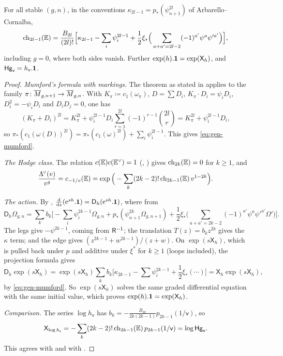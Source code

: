 \begin{lem}
\label{lem:gen-mumford}
For all stable $(g,n)$, in the conventions $\kappa_{2l-1}=p_*(\psi_{n+1}^{2l})$ of Arbarello--Cornalba,
\begin{equation}
\mathrm{ch}_{2l-1}(\mathbb{E})=\frac{B_{2l}}{(2l)!}\Big[\kappa_{2l-1}-\sum_i\psi_i^{2l-1}+\frac12\xi_*\Big(\sum_{a+a'=2l-2}(-1)^{a'}\psi^a\psi'^{a'}\Big)\Big],
\label{eq:gen-mumford}
\end{equation}
including $g=0$, where both sides vanish. Further $\exp(h).\mathbf{1}=\exp(\mathsf{X}_h)$, and $\mathsf{Hg}_{\mathsf{v}}=h_{\mathsf{v}}.\mathbf{1}$.
\end{lem}
\begin{proof}
\emph{Mumford's formula with markings.} The theorem as stated in \cite[Theorem (Mumford), Section~1.1]{FP00} applies to the family $\pi\colon\overline{M}_{g,n+1}\to\overline{M}_{g,n}$. With $K_{\pi}\coloneqq c_1(\omega_\pi)$, $D=\sum D_i$, $K_{\pi}\cdot D_i=\psi_iD_i$, $D_i^2=-\psi_iD_i$ and $D_iD_j=0$, one has
\[
(K_{\pi}+D_i)^{2l}=K_{\pi}^{2l}+\psi_i^{2l-1}D_i\sum_{r=1}^{2l}(-1)^{r-1}\binom{2l}{r}=K_{\pi}^{2l}+\psi_i^{2l-1}D_i,
\]
so $\pi_*(c_1(\omega(D))^{2l})=\pi_*(c_1(\omega)^{2l})+\sum_i\psi_i^{2l-1}$. This gives \cref{eq:gen-mumford}.

\emph{The Hodge class.} The relation $c(\mathbb{E})c(\mathbb{E}^\vee)=1$ (\cite[(5.4), (5.5)]{Mum83}, \cite[Section~2 before (22)]{FP00}) gives $\mathrm{ch}_{2k}(\mathbb{E})=0$ for $k\geq1$, and
\[
\frac{\Lambda^{\!\vee}(v)}{v^g}=c_{-1/v}(\mathbb{E})=\exp\Big(-\sum_k(2k-2)!\,\mathrm{ch}_{2k-1}(\mathbb{E})\,v^{1-2k}\Big).
\]

\emph{The action.} By \cite[Prop.~2.14]{PPZ15}, $\frac{\mathrm{d}}{\mathrm{d} s}(\mathrm{e}^{sh}.\mathbf{1})=\mathsf{D}_h(\mathrm{e}^{sh}.\mathbf{1})$, where from \cite[Defs.~2.2, 2.13]{PPZ15}
\[
\mathsf{D}_h\Omega_{g,n}=\sum_kb_k\Big[-\sum_i\psi_i^{2k-1}\Omega_{g,n}+p_*(\psi_{n+1}^{2k}\Omega_{g,n+1})+\frac12\xi_*\Big(\sum_{a+a'=2k-2}(-1)^{a'}\psi^a\psi'^{a'}\Omega'\Big)\Big].
\]
The legs give $-\psi^{2k-1}$, coming from $\mathsf{R}^{-1}$; the translation $T(z)=b_kz^{2k}$ gives the $\kappa$ term; and the edge gives $(z^{2k-1}+w^{2k-1})/(z+w)$. On $\exp(s\mathsf{X}_h)$, which is pulled back under $p$ and additive under $\xi^*$ for $k\geq1$ (loops included), the projection formula gives
\[
\mathsf{D}_h\exp(s\mathsf{X}_h)=\exp(s\mathsf{X}_h)\sum_kb_k\Big[\kappa_{2k-1}-\sum\psi_i^{2k-1}+\frac12\xi_*(\cdots)\Big]=\mathsf{X}_h\exp(s\mathsf{X}_h),
\]
by \cref{eq:gen-mumford}. So $\exp(s\mathsf{X}_h)$ solves the same graded differential equation with the same initial value, which proves $\exp(h).\mathbf{1}=\exp(\mathsf{X}_h)$.

\emph{Comparison.} The series $\log h_{\mathsf{v}}$ has $b_k=-\frac{B_{2k}}{2k(2k-1)}p_{2k-1}(1/\mathsf{v})$, so
\[
\mathsf{X}_{\log h_{\mathsf{v}}}=-\sum_k(2k-2)!\,\mathrm{ch}_{2k-1}(\mathbb{E})\,p_{2k-1}(1/\mathsf{v})=\log\mathsf{Hg}_{\mathsf{v}}.
\]
 This agrees with \cite[Prop.~8.7(i)]{Tel12} and with \cite[Section~2.3, Lemma]{Giv01}.
\end{proof}

